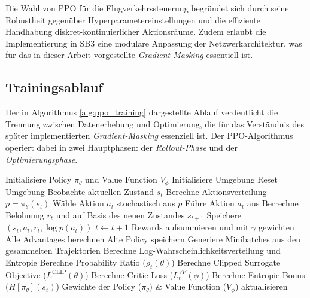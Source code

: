 Die Wahl von \ac{PPO} für die Flugverkehrssteuerung begründet sich durch seine Robustheit gegenüber Hyperparametereinstellungen und die effiziente Handhabung
diskret\hyp{}kontinuierlicher Aktionsräume. Zudem erlaubt die Implementierung in \ac{SB3} \cite{sb3} eine modulare Anpassung der Netzwerkarchitektur,
was für das in dieser Arbeit vorgestellte \textit{Gradient\hyp{}Masking} essentiell ist.

\subsection{Trainingsablauf}
Der in Algorithmus \ref{alg:ppo_training} dargestellte Ablauf verdeutlicht die Trennung zwischen Datenerhebung und Optimierung, die für das Verständnis des später implementierten \textit{Gradient\hyp{}Masking} essenziell ist.
Der \ac{PPO}\hyp{}Algorithmus operiert dabei in zwei Hauptphasen: der \textit{Rollout\hyp{}Phase} und der \textit{Optimierungsphase}.

\begin{algorithm}[H]
\begin{algorithmic}[1]
\State Initialisiere Policy $\pi_\theta$ und Value Function $V_\phi$
\State Initialisiere Umgebung
    \State Reset Umgebung
        \State Beobachte aktuellen Zustand $s_t$
        \State Berechne Aktionsverteilung $p = \pi_\theta(s_t)$
        \State Wähle Aktion $a_t$ stochastisch aus $p$
        \State Führe Aktion $a_t$ aus
        \State Berrechne Belohnung $r_t$ und auf Basis des neuen Zustandes $s_{t+1}$
        \State Speichere $(s_t, a_t, r_t, \log p(a_t))$
        \State $t \gets t+1$
    \EndWhile
    \State Rewards aufsummieren und mit $\gamma$ gewichten
    \State Alle Advantages berechnen
    \State Alte Policy speichern
        \State Generiere Minibatches aus den gesammelten Trajektorien
            \State Berechne Log-Wahrscheinlichkeitsverteilung und Entropie
            \State Berechne Probability Ratio ($\rho_t(\theta)$)
            \State Berechne Clipped Surrogate Objective ($L^{\text{CLIP}}(\theta)$)
            \State Berechne Critic Loss ($L_t^{VF}(\phi)$)
            \State Berechne Entropie-Bonus ($H[\pi_\theta](s_t)$)
            \State Gewichte der Policy ($\pi_\theta$) \& Value Function ($V_\phi$) aktualisieren
        \EndFor
    \EndFor
\EndWhile
\end{algorithmic}
\caption{Beispielhaft vereinfachter \ac{PPO}-Trainingsablauf}
\label{alg:ppo_training}
\end{algorithm}


